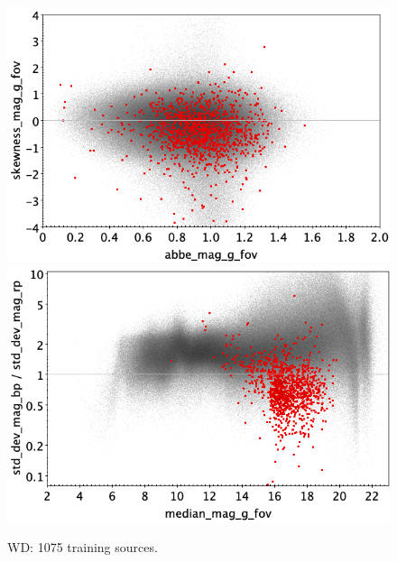 \documentclass[longauth]{aa}
\begin{document}
\begin{appendix}
\begin{figure}
\vspace{4mm}
 \includegraphics[width=0.45\hsize]{figures/appendix/WD_trn_ask.png}  %
\hspace{2mm}
 \includegraphics[width=0.45\hsize]{figures/appendix/WD_trn_msdr.png}  \\ %
\vspace{4mm}
 \caption{WD: 1075 training sources.}  
 \label{fig:app:WD_trn}
\end{figure}


\end{appendix}
\end{document}

